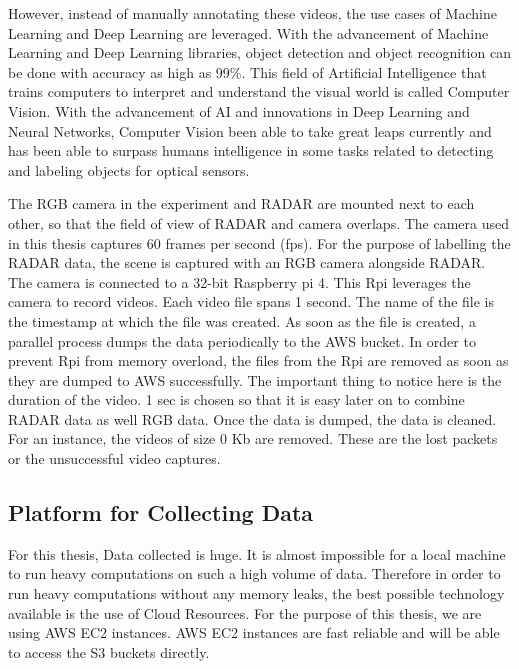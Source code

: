 However, instead of manually annotating these videos, the use cases of Machine Learning and Deep Learning are leveraged. With the advancement of Machine Learning and Deep Learning libraries, object detection and object recognition can be done with accuracy as high as 99\%. This field of Artificial Intelligence that trains computers to interpret and understand the visual world is called Computer Vision. With the advancement of AI and innovations in Deep Learning and Neural Networks, Computer Vision been able to take great leaps currently and has been able to surpass humans intelligence in some tasks related to detecting and labeling objects for optical sensors.


The RGB camera in the experiment and RADAR are mounted next to each other, so that the field of view of RADAR and camera overlaps. The camera used in this thesis captures 60 frames per second (fps). For the purpose of labelling the RADAR data, the scene is captured with an RGB camera alongside RADAR. The camera is connected to a 32-bit Raspberry pi 4. This Rpi leverages the camera to record videos. Each video file spans 1 second. The name of the file is the timestamp at which the file was created. As soon as the file is created, a parallel process dumps the data periodically to the AWS bucket. In order to prevent Rpi from memory overload, the files from the Rpi are removed as soon as they are dumped to AWS successfully. The important thing to notice here is the duration of the video. 1 sec is chosen so that it is easy later on to combine RADAR data as well RGB data. Once the data is dumped, the data is cleaned. For an instance, the videos of size 0 Kb are removed. These are the lost packets or the unsuccessful video captures.

\subsection{Platform for Collecting Data}
For this thesis, Data collected is huge. It is almost impossible for a local machine to run heavy computations on such a high volume of data. Therefore in order to run heavy computations without any memory leaks, the best possible technology available is the use of Cloud Resources. For the purpose of this thesis, we are using AWS EC2 instances. AWS EC2 instances are fast reliable and will be able to access the S3 buckets directly. 

